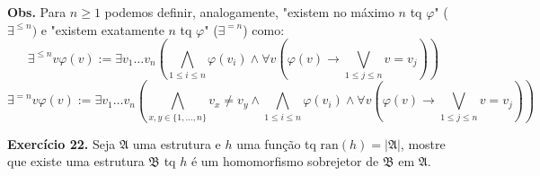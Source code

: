 \documentclass[11pt]{article}
\newcommand{\mf}[1]{\mathfrak{#1}}
\begin{document}
\begin{shaded}
\textbf{Obs.} Para $n\geq1$ podemos definir, analogamente, "existem no máximo $n$ tq $\varphi$" ($\exists^{\leq n})$ e "existem exatamente $n$ tq $\varphi$" ($\exists^{=n}$) como:
$$\exists^{\leq n}v\varphi(v):=\exists v_1\dots v_n\left(\bigwedge_{1\leq i\leq n}\varphi(v_i)\wedge\forall v\left(\varphi(v)\rightarrow\bigvee_{1\leq j\leq n}v=v_j\right)\right)$$
$$\exists^{=n}v\varphi(v):=\exists v_1\dots v_n\left(\bigwedge_{x,y\in\{1,\dots,n\}}v_x\neq v_y\wedge\bigwedge_{1\leq i\leq n}\varphi(v_i)\wedge\forall v\left(\varphi(v)\rightarrow\bigvee_{1\leq j\leq n}v=v_j\right)\right)$$
\end{shaded}

\begin{shaded}
\textbf{Exercício 22.} Seja $\mf{A}$ uma estrutura e $h$ uma função tq $\text{ran}(h)=|\mf{A}|$, mostre que existe uma estrutura $\mf{B}$ tq $h$ é um homomorfismo sobrejetor de $\mf{B}$ em $\mf{A}$.
\end{shaded}
\end{document}
